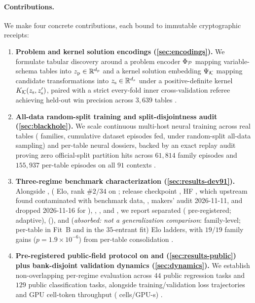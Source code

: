 \paragraph{Contributions.}
We make four concrete contributions, each bound to immutable cryptographic receipts:
\begin{enumerate}
  \item \textbf{Problem and kernel solution encodings (\cref{sec:encodings}).} We formulate tabular discovery around a problem encoder $\Phi_{\mathcal{P}}$ mapping variable-schema tables into $z_{\mathrm{p}} \in \mathbb{R}^{d_p}$ and a kernel solution embedding $\Psi_{\mathcal{K}}$ mapping candidate transformations into $z_{\mathrm{s}} \in \mathbb{R}^{d_s}$ under a positive-definite kernel $K_{\mathcal{K}}(z_{\mathrm{s}},z_{\mathrm{s}}')$, paired with a strict every-fold inner cross-validation referee achieving \BHKernelGatePrec{} held-out win precision across $3{,}639$ tables \est{}.
  \item \textbf{All-data random-split training and split-disjointness audit (\cref{sec:blackhole}).} We scale continuous multi-host neural training across \BHRFiveTables{} real tables (\BHRFiveFamilies{} families, \BHTotalDatasetsFed{} cumulative dataset episodes fed, \BHAllDataDatasetsFed{} under random-split all-data sampling) and per-table neural dossiers, backed by an exact replay audit proving zero official-split partition hits across $61{,}814$ family episodes and $155{,}937$ per-table episodes on all $91$  contexts \est{}.
  \item \textbf{Three-regime  benchmark characterization (\cref{sec:results-dev91}).} Alongside ,  \citep{zhang2026limix2} (\BHEloLimiXBoard{} Elo, rank $\#2/34$ on ; release checkpoint , HF , which upstream found contaminated with benchmark data, , makers' audit 2026-11-11, and  dropped 2026-11-16 for ), , , and , we report separated \regfair{} (\BHEloFairReg{} pre-registered; \BHEloFairAdaptive{} adaptive), \regincorpus{} (\BHEloInCorpus{}), and \regrecall{} (\emph{absorbed: not a generalization comparison}: \BHEloRecall{} family-level; \BHEloGenTwoA{} per-table in Fit~B and \BHEloGenTwoAJoint{} in the $35$-entrant fit) Elo ladders, with $19/19$ family gains ($p = 1.9\times 10^{-6}$) from per-table consolidation \est{}.
  \item \textbf{Pre-registered public-field protocol on  and  (\cref{sec:results-public}) plus bank-disjoint validation dynamics (\cref{sec:dynamics}).} We establish non-overlapping per-regime evaluation across $44$ public regression tasks and $129$ public classification tasks, alongside training/validation loss trajectories and GPU cell-token throughput (\BHInferGpuCellsPerSec{} cells/GPU-s) \pre{}.
\end{enumerate}

